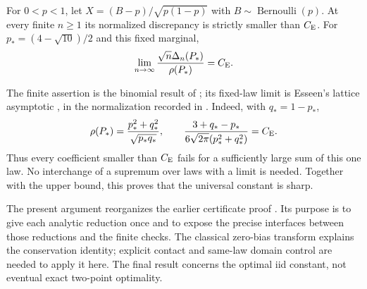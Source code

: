 \begin{proposition}
\label{j:external:binomial}\label{j:external:limit}
For $0<p<1$, let $X=(B-p)/\sqrt{p(1-p)}$ with
$B\sim\operatorname{Bernoulli}(p)$. At every finite $n\ge1$ its
normalized discrepancy is strictly smaller than $C_{\mathrm E}$.
For $p_*=(4-\sqrt{10})/2$ and this fixed marginal,
\[
 \lim_{n\to\infty}\frac{\sqrt n\Delta_n(P_*)}{\rho(P_*)}=C_{\mathrm E}.
\]
\end{proposition}
The finite assertion is the binomial result of
\citet[Theorem~1]{Schulz2016}; its fixed-law limit is Esseen's lattice
asymptotic \cite{Esseen1956}, in the normalization recorded in
\citet[Remarks~4.1--4.2]{Schulz2016}. Indeed, with $q_*=1-p_*$,
\[
 \rho(P_*)=\frac{p_*^2+q_*^2}{\sqrt{p_*q_*}},\qquad
 \frac{3+q_*-p_*}{6\sqrt{2\pi}(p_*^2+q_*^2)}=C_{\mathrm E}.
\]
Thus every coefficient smaller than $C_{\mathrm E}$ fails for a sufficiently
large sum of this one law. No interchange of a supremum over laws
with a limit is needed. Together with the upper bound, this proves
that the universal constant is sharp.

The present argument reorganizes the earlier certificate proof
\cite{kolodziejekrodziewicz2026exact}. Its purpose is to give each
analytic reduction once and to expose the precise interfaces between
those reductions and the finite checks. The classical zero-bias
transform \cite{GoldsteinReinert1997} explains the conservation
identity; explicit contact and same-law domain control are needed to
apply it here. The final result concerns the optimal iid constant,
not eventual exact two-point optimality.
